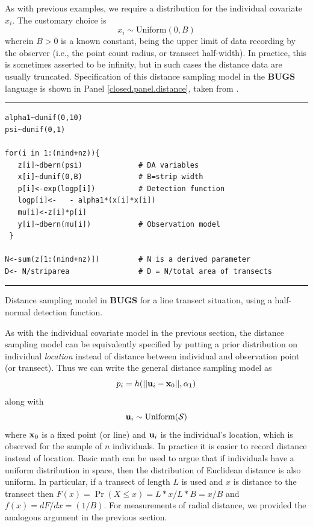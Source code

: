 As with previous examples, we require a distribution for the
individual covariate $x_{i}$. The customary choice is
\[
x_{i} \sim \mbox{Uniform}(0,B)
\]
wherein $B>0$ is a known constant, being the upper limit of data
recording by the observer (i.e., the point count radius, or transect
half-width). In practice, this is sometimes asserted to be infinity,
but in such cases the distance data are usually truncated.
Specification of this distance sampling model in the {\bf BUGS}
language  is
shown in Panel \ref{closed.panel.distance}, taken from \citet{royle_dorazio:2008}.


\begin{panel}
\centering
\rule[0.15in]{\textwidth}{.03in}
\begin{minipage}{5in}
\begin{verbatim}
alpha1~dunif(0,10)
psi~dunif(0,1)

for(i in 1:(nind+nz)){
   z[i]~dbern(psi)             # DA variables
   x[i]~dunif(0,B)             # B=strip width
   p[i]<-exp(logp[i])          # Detection function
   logp[i]<-   - alpha1*(x[i]*x[i])
   mu[i]<-z[i]*p[i]
   y[i]~dbern(mu[i])           # Observation model 
 }

N<-sum(z[1:(nind+nz)])         # N is a derived parameter
D<- N/striparea                # D = N/total area of transects
\end{verbatim}
\end{minipage}
\rule[-0.15in]{\textwidth}{.03in}
\caption{Distance sampling model in {\bf BUGS} for a line transect situation, using a half-normal
detection function.}
\label{closed.panel.distance}
\end{panel}

As with the individual covariate model in the previous section, the
distance sampling model can be equivalently specified by putting a
prior distribution on individual {\it location} instead of distance
between individual and observation point (or transect).  Thus we can
write the general distance sampling model as
\[
p_{i} = h(||{\bf u}_{i} - {\bf x}_0||,\alpha_{1})
\]
along with
\[
 {\bf u}_{i} \sim \mbox{Uniform}({\cal S})
\]
where ${\bf x}_{0}$ is a fixed point (or line) and ${\bf u}_{i}$ is
the individual's location,  which is observed for the sample of $n$ individuals. In
practice it is easier to record distance instead of location.  Basic
math can be used to argue that if individuals have a uniform
distribution in space, then the distribution of Euclidean distance is
also uniform. In particular, if a transect of length $L$ is used and $x$
is distance to the transect then $F(x) = \Pr(X\le x) = L*x/L*B = x/B$ and
$f(x) = dF/dx = (1/B)$. For measurements of radial distance, we
provided the analogous argument in the
previous section.


